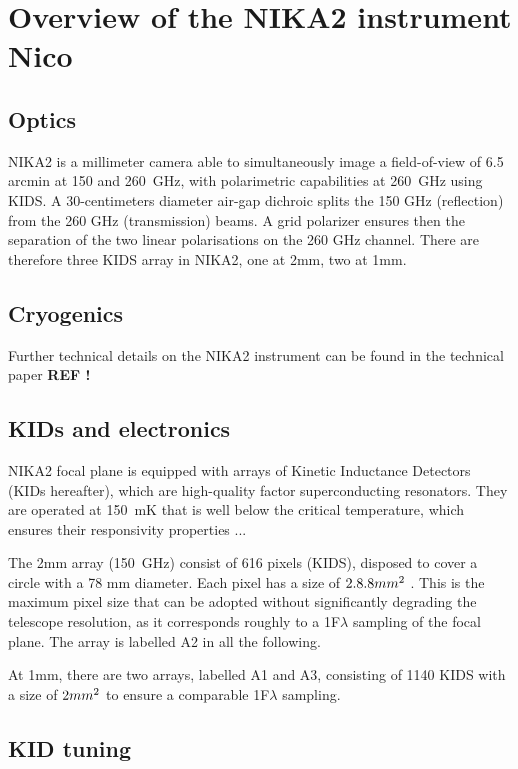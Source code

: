 
\section{Overview of the NIKA2 instrument {\color{Blue} Nico} }

\subsection{Optics}

NIKA2 is a millimeter camera able to simultaneously image a
field-of-view of 6.5\,arcmin at 150 and 260~GHz, with polarimetric
capabilities at 260~GHz using KIDS. A 30-centimeters diameter air-gap
dichroic splits the 150 GHz (reflection) from the 260 GHz
(transmission) beams.  A grid polarizer ensures then the separation of
the two linear polarisations on the 260 GHz channel.  There are
therefore three KIDS array in NIKA2, one at 2mm, two at 1mm. 




\subsection{Cryogenics}
Further technical details on the NIKA2 instrument can be found in the
technical paper {\bf REF !}



\subsection{KIDs and electronics}

NIKA2 focal plane is equipped with arrays of Kinetic Inductance
Detectors (KIDs hereafter), which are high-quality factor
superconducting resonators. They are operated at 150~mK that is well
below the critical temperature, which ensures their responsivity
properties ... 


The 2mm array (150~GHz) consist of 616 pixels
(KIDS), disposed to cover a circle with a 78 mm diameter. Each pixel
has a size of $2.8 \time 2.8 mm^{2}$ . This is the maximum pixel size that can
be adopted without significantly degrading the telescope resolution,
as it corresponds roughly to a 1F$\lambda$ sampling of the focal
plane.  The array is labelled A2 in all the following.

At 1mm, there are two arrays, labelled A1 and A3, consisting of 1140
KIDS with a size of $2 \time 2 mm^{2}$ to ensure a comparable 1F$\lambda$
sampling.




\subsection{KID tuning}





